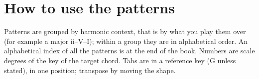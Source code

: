 \documentclass[11pt,openany]{book}
\begin{document}
\tableofcontents
\chapter*{How to use the patterns}
Patterns are grouped by harmonic context, that is by what you play them over
(for example a major ii--V--I); within a group they are in alphabetical order.
An alphabetical index of all the patterns is at the end of the book.
Numbers are scale degrees of the key of the target chord. Tabs are in a
reference key (G unless stated), in one position; transpose by moving the shape.

\medskip



\end{document}
